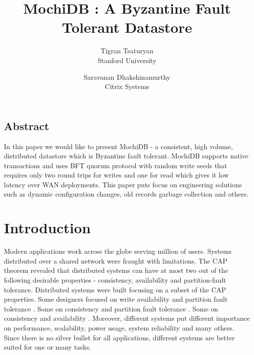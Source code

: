 \documentclass[letterpaper,twocolumn,10pt]{article}
\begin{document}
\date{}

\title{\Large \bf MochiDB : A Byzantine Fault Tolerant Datastore}

\author{
{\rm Tigran Tsaturyan}\\
Stanford University
\and
{\rm Saravanan Dhakshinamurthy}\\
Citrix Systems
}

\maketitle

\thispagestyle{empty}


\subsection*{Abstract}
In this paper we would like to present MochiDB - a consistent, high volume, distributed datastore which is Byzantine fault tolerant. MochiDB supports native transactions and uses BFT quorum protocol with random write seeds that requires only two round trips for writes and one for read which gives it low latency over WAN deployments. This paper puts focus on engineering solutions such as dynamic configuration changes, old records garbage collection and others. 

\section{Introduction}

Modern applications work across the globe serving million of users. Systems distributed over a shared network were fraught with limitations. The CAP theorem \cite{CAP_theorem} revealed that distributed systems can have at most two out of the following desirable properties - consistency, availability and partition-fault tolerance. Distributed systems were built focusing on a subset of the CAP properties. Some designers focused on write availability and partition fault tolerance \cite{Dynamo}. Some on consistency and partition fault tolerance \cite{RAFT}. Some on consistency and availability \cite{MYSQL_replication}. Moreover, different systems put different importance on performance, scalability, power usage, system reliability and many others. Since there is no silver bullet for all applications, different systems are better suited for one or many tasks.
\end{document}
